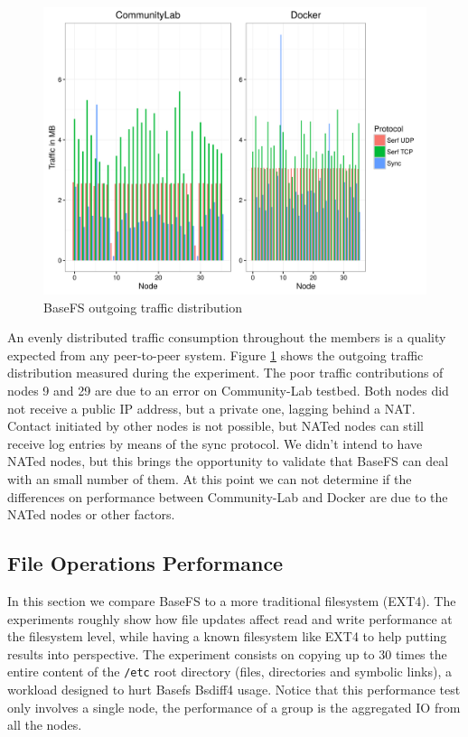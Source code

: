 \documentclass{sig-alternate}
\begin{document}
\begin{figure}
\centering
\includegraphics[width=\columnwidth]{imgs/basefs-traffic-distribution.png}
\caption{BaseFS outgoing traffic distribution}
\label{fig:basefs-traffic-distribution}
\end{figure}


An evenly distributed traffic consumption throughout the members is a quality expected from any peer-to-peer system. Figure \ref{fig:basefs-traffic-distribution} shows the outgoing traffic distribution measured during the experiment. The poor traffic contributions of nodes 9 and 29 are due to an error on Community-Lab testbed. Both nodes did not receive a public IP address, but a private one, lagging behind a NAT. Contact initiated by other nodes is not possible, but NATed nodes can still receive log entries by means of the sync protocol. We didn't intend to have NATed nodes, but this brings the opportunity to validate that BaseFS can deal with an small number of them. At this point we can not determine if the differences on performance between Community-Lab and Docker are due to the NATed nodes or other factors.



\subsection{File Operations Performance}
    
In this section we compare BaseFS to a more traditional filesystem (EXT4). The experiments roughly show how file updates affect read and write performance at the filesystem level, while having a known filesystem like EXT4 to help putting results into perspective. The experiment consists on copying up to 30 times the entire content of the \texttt{/etc} root directory (files, directories and symbolic links), a workload designed to hurt Basefs Bsdiff4 usage. Notice that this performance test only involves a single node, the performance of a group is the aggregated IO from all the nodes.
\end{document}
